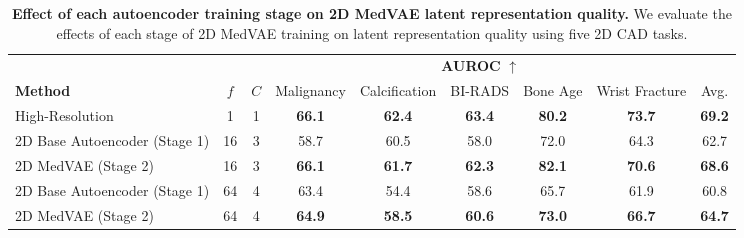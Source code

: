 \begin{table*}[t]
\centering
\resizebox{\linewidth}{!}
{%
\begin{tabular}{ lcccccccc }
\toprule
\textbf{}
& \multicolumn{2}{c}{\textbf{}}
& \multicolumn{5}{c}{\textbf{AUROC} $\uparrow$}
& \textbf{}
\\
\cmidrule(l{3pt}r{0pt}){4-8}
\cmidrule(l{3pt}r{0pt}){9-9}
\textbf{Method}
& \textbf{$f$}
& \textbf{$C$}
& \small Malignancy
& \small Calcification
& \small BI-RADS
& \small Bone Age
& \small Wrist Fracture
& Avg.
\\ 
\midrule
\small High-Resolution & 1 & 1 & \textbf{66.1} & \textbf{62.4} & \textbf{63.4} & \textbf{80.2}  & \textbf{73.7} & \textbf{69.2}\\

\midrule
\small 2D Base Autoencoder (Stage 1) \hspace{0.5mm} & 16 & 3 &  58.7 & 60.5 & 58.0 & 72.0 & 64.3 & 62.7 \\
\small 2D MedVAE (Stage 2) \hspace{0.5mm} & 16 & 3 &   \textbf{66.1} &   \textbf{61.7} & \textbf{62.3} & \textbf{82.1}  &   \textbf{70.6} & \textbf{68.6}\\
\midrule

\small 2D Base Autoencoder (Stage 1) \hspace{0.5mm} & 64 & 4 &   63.4 &  54.4 & 58.6 & 65.7 & 61.9 & 60.8 \\
\small 2D MedVAE (Stage 2) \hspace{0.5mm} & 64 & 4  &  \textbf{64.9} &  \textbf{58.5} & \textbf{60.6} &\textbf{ 73.0} & \textbf{66.7} & \textbf{64.7}\\
\bottomrule
\end{tabular}
}
\caption{\textbf{Effect of each autoencoder training stage on 2D MedVAE latent representation quality.} We evaluate the effects of each stage of 2D MedVAE training on latent representation quality using five 2D CAD tasks.}
\label{table:ablations2d}
\vspace{-1mm}
\end{table*}


